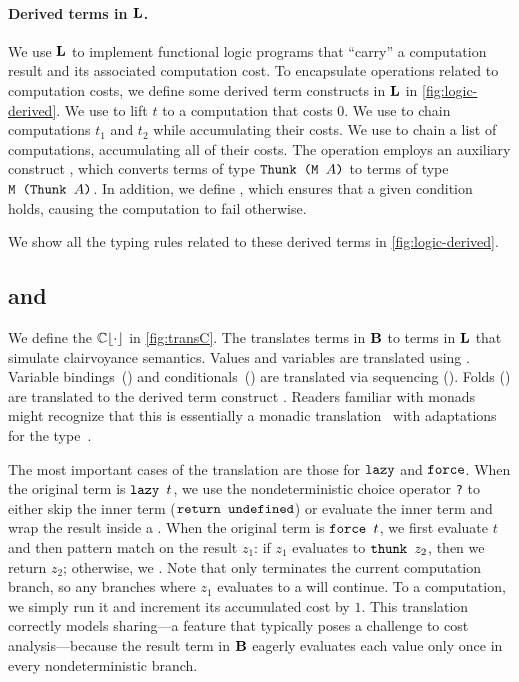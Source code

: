 \paragraph{Derived terms in \(\LL\).}
We use \(\LL\) to implement functional logic programs that ``carry'' a
computation result and its associated computation cost. To encapsulate
operations related to computation costs, we define some derived term constructs
in \(\LL\) in \cref{fig:logic-derived}. We use  to lift \(t\) to a
computation that costs \(0\). We use  to chain computations
\(t_1\) and \(t_2\) while accumulating their costs. We use
 to chain a list of computations, accumulating
all of their costs. The \tfoldMZ{} operation employs an auxiliary construct
\ttransposeZ, which converts terms of type $\TThunk{\texttt{(\(\TM{A}\))}}$ to terms of
type $\TM{\texttt{(\(\TThunk{A}\))}}$. In addition, we define \tassertZ{}, which ensures
that a given condition holds, causing the computation to fail otherwise.

We show all the typing rules related to these derived terms in
\cref{fig:logic-derived}.

\subsection{\TransCname{} and \TransDname{}}\label{subsec:clairvoyance-translation}\label{subsec:demand-translation}

We define the \transCname{} \(\transC{\cdot}\) in \cref{fig:transC}. The
\transCname{} translates terms in \(\LB\) to terms in \(\LL\) that simulate
clairvoyance semantics. Values and variables are translated using \treturnZ.
Variable bindings~(\tletZ) and conditionals~(\tifZ) are translated via
sequencing (\tdo{\cdot}{\cdot}{\cdot}). Folds (\tfoldrZ{}) are translated to the
derived term construct \tfoldMZ. Readers familiar with monads might recognize
that this is essentially a monadic
translation~\cite{moggi-monad,malias,wadler-monad} with adaptations for the
\TLazyZ{} type~\cite{forking-paths}.

The most important cases of the translation are those for \(\tlazyZ\) and
\(\tforceZ\). When the original term is \(\tlazy{t}\), we use the
nondeterministic choice operator \texttt{?} to either skip the inner term
(\(\treturn{\tundefined}\)) or evaluate the inner term and wrap the result
inside a \tresultZ. When the original term is \(\tforce{t}\), we first evaluate
\(t\) and then pattern match on the result \(z_1\): if \(z_1\) evaluates to
\(\tresult{z_2}\), then we return \(z_2\); otherwise, we \tfail. Note that
\tfail{} only terminates the current computation branch, so any branches where
\(z_1\) evaluates to a \tresultZ{} will continue. To \ttickZ{} a computation, we
simply run it and increment its accumulated cost by \(1\). This translation
correctly models sharing---a feature that typically poses a challenge to cost
analysis---because the result term in \(\LB\) eagerly evaluates each value only
once in every nondeterministic branch.


